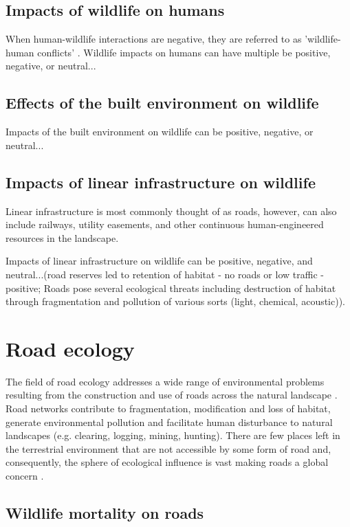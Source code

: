 \subsection{Impacts of wildlife on humans}

When human-wildlife interactions are negative, they are referred to as 'wildlife-human conflicts' \citep{}.  Wildlife impacts on humans can have multiple be positive, negative, or neutral...

\subsection{Effects of the built environment on wildlife}

Impacts of the built environment on wildlife can be positive, negative, or neutral...

\subsection{Impacts of linear infrastructure on wildlife}

Linear infrastructure is most commonly thought of as roads, however, can also include railways, utility easements, and other continuous human-engineered resources in the landscape. 

Impacts of linear infrastructure on wildlife can be positive, negative, and neutral...(road reserves led to retention of habitat - no roads or low traffic - positive; Roads pose several ecological threats including destruction of habitat through fragmentation and pollution of various sorts (light, chemical, acoustic)).

\section{Road ecology}

The field of road ecology addresses a wide range of environmental problems resulting from the construction and use of roads across the natural landscape \citep{form03,rvdr15}. Road networks contribute to fragmentation, modification and loss of habitat, generate environmental pollution and facilitate human disturbance to natural landscapes (e.g. clearing, logging, mining, hunting). There are few places left in the terrestrial environment that are not accessible by some form of road and, consequently, the sphere of ecological influence is vast making roads a global concern \citep{}.

\subsection{Wildlife mortality on roads}

